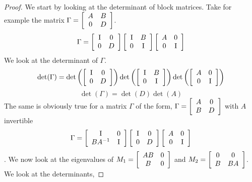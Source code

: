 \documentclass{article}
\begin{document}
\begin{enumerate}
\begin{proof}
    We start by looking at the determinant of block matrices. Take for example the matrix $\Gamma = \left[\begin{array}{c c} A & B \\ 0 & D\end{array}\right]$.
    \[
        \Gamma = \left[\begin{array}{c c} \mathrm{I} & 0 \\ 0 & D \end{array}\right]\left[\begin{array}{c c} \mathrm{I} & B \\ 0 & \mathrm{I} \end{array}\right] \left[\begin{array}{c c} A & 0 \\ 0 & \mathrm{I}\end{array}\right]
    \]
    We look at the determinant of $\Gamma$. 
    \[
        \det(\Gamma) = \det\left(\left[\begin{array}{c c} \mathrm{I} & 0 \\ 0 & D \end{array}\right]\right)\det\left(\left[\begin{array}{c c} \mathrm{I} & B \\ 0 & \mathrm{I} \end{array}\right]\right)\det\left(\left[\begin{array}{c c} A & 0 \\ 0 & \mathrm{I} \end{array}\right]\right)
    \] 
    \[
        \det(\Gamma) = \det(D)\det(A)
    \]
    The same is obviously true for a matrix $\Gamma$ of the form, $\Gamma = \left[\begin{array}{c c} A & 0 \\ B & D\end{array}\right]$ with $A$ invertible \[\Gamma = \left[\begin{array}{c c} \mathrm{I} & 0 \\ BA^{-1} & \mathrm{I} \end{array}\right]\left[\begin{array}{c c} \mathrm{I} & 0 \\ 0 & D \end{array}\right] \left[\begin{array}{c c} A & 0 \\ 0 & \mathrm{I}\end{array}\right]\]
. We now look at the eigenvalues of $M_1 = \left[\begin{array}{c c} AB & 0 \\ B & 0\end{array}\right]$ and $M_2 = \left[\begin{array}{c c} 0 & 0 \\ B & BA \end{array}\right]$. We look at the determinants, 

\end{proof}
\end{enumerate}
\end{document}

